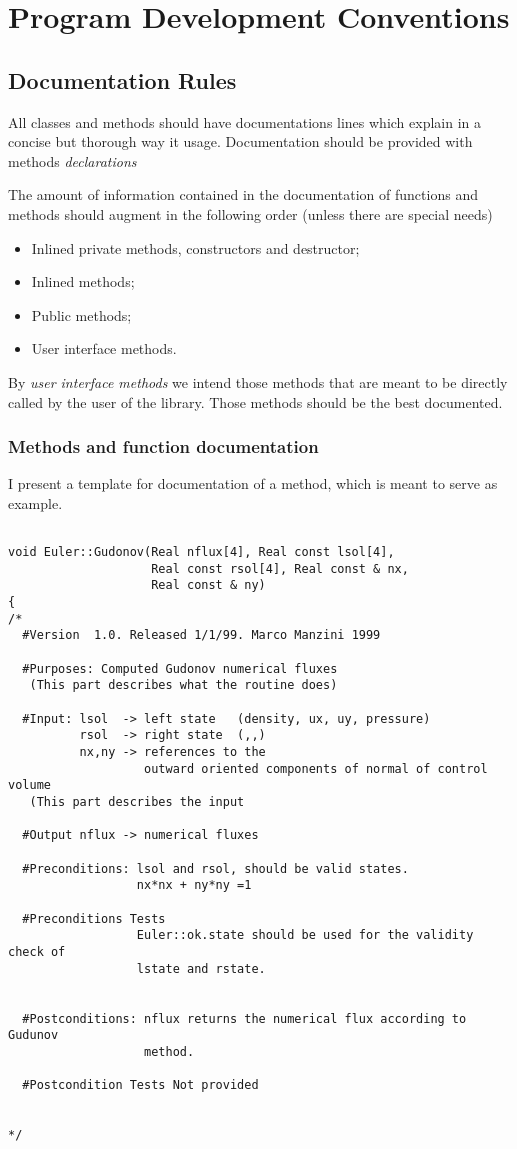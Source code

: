 \chapter{Program Development Conventions} 

\section{Documentation Rules} 


All classes and methods should have
documentations lines which explain in a concise but thorough way it
usage. Documentation should be provided  with methods
\emph{declarations}

The amount of information contained in the documentation of functions
and methods should augment in the following order (unless there are
special needs)
\begin{itemize}
\item Inlined private methods, constructors and destructor;
\item Inlined methods;
\item Public methods;
\item User interface methods.
\end{itemize}
By \emph{user interface methods} we intend those methods that are
meant to be directly called by the user of the library. Those methods
should be the best documented.

\subsection{Methods and function documentation}
\label{sec:fdoc}
I present a template for documentation of a method, which is meant to
serve as example.


\begin{verbatim}

void Euler::Gudonov(Real nflux[4], Real const lsol[4],
                    Real const rsol[4], Real const & nx,
                    Real const & ny)
{
/*
  #Version  1.0. Released 1/1/99. Marco Manzini 1999

  #Purposes: Computed Gudonov numerical fluxes
   (This part describes what the routine does)

  #Input: lsol  -> left state   (density, ux, uy, pressure)
          rsol  -> right state  (,,)
          nx,ny -> references to the 
                   outward oriented components of normal of control volume
   (This part describes the input 
  
  #Output nflux -> numerical fluxes

  #Preconditions: lsol and rsol, should be valid states. 
                  nx*nx + ny*ny =1   

  #Preconditions Tests
                  Euler::ok.state should be used for the validity check of 
                  lstate and rstate.
                  
                  
  #Postconditions: nflux returns the numerical flux according to Gudunov
                   method. 

  #Postcondition Tests Not provided


*/
\end{verbatim}

